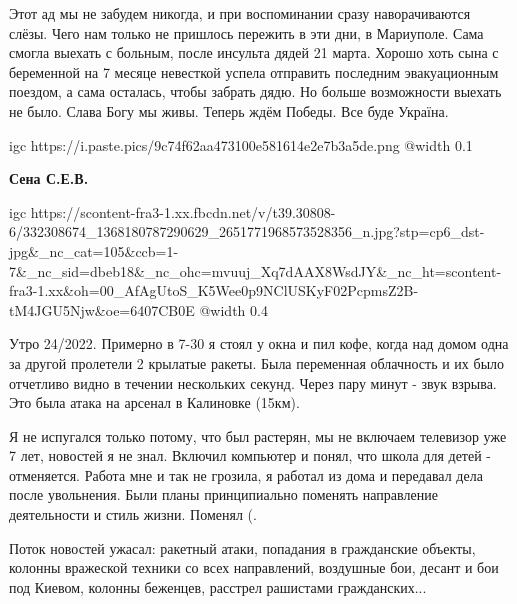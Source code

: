  
 
 
 
 

\qqSecCmt


Этот ад мы не забудем никогда, и при воспоминании сразу наворачиваются слёзы.
Чего нам только не пришлось пережить в эти дни, в Мариуполе. Сама смогла
выехать с больным, после инсульта дядей 21 марта. Хорошо хоть сына с беременной
на 7 месяце невесткой успела отправить последним эвакуационным поездом, а сама
осталась, чтобы забрать дядю. Но больше возможности выехать не было. Слава Богу
мы живы. Теперь ждём Победы. Все буде Україна.


\ifcmt
  igc https://i.paste.pics/9c74f62aa473100e581614e2e7b3a5de.png
	@width 0.1
\fi

\textbf{Сена С.Е.В.}

\ifcmt
  igc https://scontent-fra3-1.xx.fbcdn.net/v/t39.30808-6/332308674_1368180787290629_2651771968573528356_n.jpg?stp=cp6_dst-jpg&_nc_cat=105&ccb=1-7&_nc_sid=dbeb18&_nc_ohc=mvuuj_Xq7dAAX8WsdJY&_nc_ht=scontent-fra3-1.xx&oh=00_AfAgUtoS_K5Wee0p9NClUSKyF02PcpmsZ2B-tM4JGU5Njw&oe=6407CB0E
	@width 0.4
\fi


Утро 24/2022. Примерно в 7-30 я стоял у окна и пил кофе, когда над домом одна
за другой пролетели 2 крылатые ракеты. Была переменная облачность и их было
отчетливо видно в течении нескольких секунд. Через пару минут - звук взрыва.
Это была атака на арсенал в Калиновке (15км).

Я не испугался только потому, что был растерян, мы не включаем телевизор уже 7
лет, новостей я не знал. Включил компьютер и понял, что школа для детей -
отменяется. Работа мне и так не грозила, я работал из дома и передавал дела
после увольнения. Были планы принципиально поменять направление деятельности и
стиль жизни. Поменял (.

Поток новостей ужасал: ракетный атаки, попадания в гражданские объекты, колонны
вражеской техники со всех направлений, воздушные бои, десант и бои под Киевом,
колонны беженцев, расстрел рашистами гражданских...

